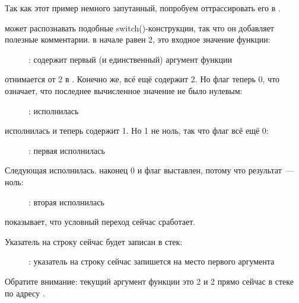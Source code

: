 ﻿\clearpage
\mysubparagraph{\olly}

Так как этот пример немного запутанный, попробуем оттрассировать его в \olly.

\olly может распознавать подобные switch()-конструкции, так что он добавляет полезные комментарии.
\EAX в начале равен 2, это входное значение функции: 

\begin{figure}[H]
\centering
{}
\caption{\olly: \EAX содержит первый (и единственный) аргумент функции}
\label{fig:switch_few_olly1}
\end{figure}

 отнимается от 2 в \EAX. 
Конечно же, \EAX всё ещё содержит 2.
Но флаг \ZF теперь 0, что означает, что последнее вычисленное значение не было нулевым:

\begin{figure}[H]
\centering
{}
\caption{\olly: \SUB исполнилась}
\label{fig:switch_few_olly2}
\end{figure}

\clearpage
\DEC исполнилась и \EAX теперь содержит 1. 
Но 1 не ноль, так что флаг \ZF всё ещё 0:

\begin{figure}[H]
\centering
{}
\caption{\olly: первая \DEC исполнилась}
\label{fig:switch_few_olly3}
\end{figure}

\clearpage
Следующая \DEC исполнилась. 
\EAX наконец 0 и флаг \ZF выставлен, потому что результат~--- ноль:

\begin{figure}[H]
\centering
{}
\caption{\olly: вторая \DEC исполнилась}
\label{fig:switch_few_olly4}
\end{figure}

\olly показывает, что условный переход сейчас сработает.

\clearpage
Указатель на строку  
сейчас будет записан в стек:

\begin{figure}[H]
\centering
{}
\caption{\olly: указатель на строку сейчас запишется на место первого аргумента}
\label{fig:switch_few_olly5}
\end{figure}

Обратите внимание: текущий аргумент функции это 2 и 2 прямо сейчас в стеке по адресу .

